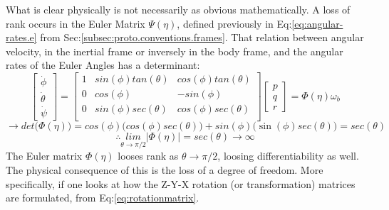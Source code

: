 \par
What is clear physically is not necessarily as obvious mathematically. A loss of rank occurs in the Euler Matrix $\Psi(\eta)$, defined previously in Eq:\ref{eq:angular-rates.e} from Sec:\ref{subsec:proto.conventions.frames}. That relation between angular velocity, in the inertial frame or inversely in the body frame, and the angular rates of the Euler Angles has a determinant:
\begin{equation}\label{eq:euler-derivative}
\begin{bmatrix}
\dot{\phi}\\
\dot{\theta}\\
\dot{\psi}
\end{bmatrix}
=\begin{bmatrix}
1 & sin(\phi)tan(\theta) & cos(\phi)tan(\theta)\\
0 & cos(\phi) & -sin(\phi)\\
0 & sin(\phi)sec(\theta) & cos(\phi)sec(\theta)\\
\end{bmatrix}
\begin{bmatrix}
p\\
q\\
r
\end{bmatrix}
=\Phi(\eta)\omega_b
\end{equation}
\vspace{-2pt}
\begin{equation}
\rightarrow det\big(\Phi(\eta)\big)=cos(\phi)\big(cos(\phi)sec(\theta)\big)+sin(\phi)\big(\sin(\phi)sec(\theta)\big)=sec(\theta)
\end{equation}
\vspace{-6pt}
\begin{equation}
\therefore \underset{{\theta \rightarrow \pi /2}}{lim}|\Phi(\eta)|=sec(\theta)\rightarrow \infty
\end{equation}
The Euler matrix $\Phi(\eta)$ looses rank as $\theta\rightarrow\pi/2$, loosing differentiability as well. The physical consequence of this is the loss of a degree of freedom. More specifically, if one looks at how the Z-Y-X rotation (or transformation) matrices are formulated, from Eq:\ref{eq:rotationmatrix}.
